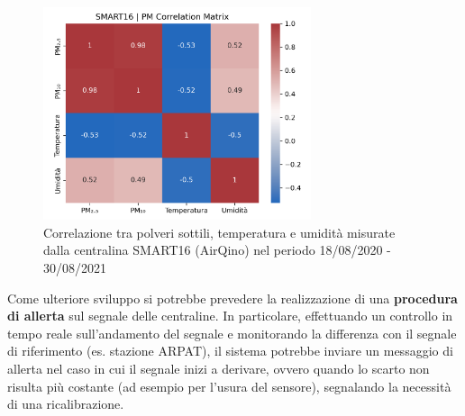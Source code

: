 \begin{figure}[H]
\centering
\captionsetup{justification=centering}
\includegraphics[width=0.70\textwidth,height=\textheight,keepaspectratio]{img/corr}
\caption{Correlazione tra polveri sottili, temperatura e umidità misurate dalla centralina SMART16 (AirQino) nel periodo 18/08/2020 - 30/08/2021}
\label{fig:corr}
\end{figure}

Come ulteriore sviluppo si potrebbe prevedere la realizzazione di una \textbf{procedura di allerta} sul segnale delle centraline. In particolare, effettuando un controllo in tempo reale sull'andamento del segnale e monitorando la differenza con il segnale di riferimento (es. stazione ARPAT), il sistema potrebbe inviare un messaggio di allerta nel caso in cui il segnale inizi a derivare, ovvero quando lo scarto non risulta più costante (ad esempio per l'usura del sensore), segnalando la necessità di una ricalibrazione.